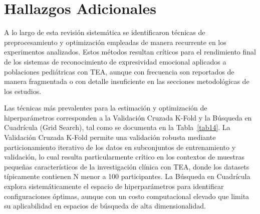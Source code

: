 \documentclass[3p,twocolumn,times]{elsarticle}
\begin{document}
	\section{Hallazgos Adicionales}\label{sec5}
	
	A lo largo de esta revisión sistemática se identificaron técnicas de
	preprocesamiento y optimización empleadas de manera recurrente en los experimentos
	analizados. Estos métodos resultan críticos para el rendimiento final de los
	sistemas de reconocimiento de expresividad emocional aplicados a poblaciones
	pediátricas con TEA, aunque con frecuencia son reportados de manera fragmentada o
	con detalle insuficiente en las secciones metodológicas de los estudios.
	
	Las técnicas más prevalentes para la estimación y optimización de hiperparámetros
	corresponden a la Validación Cruzada K-Fold y la Búsqueda en Cuadrícula (Grid
	Search), tal como se documenta en la Tabla~\ref{tab14}. La Validación Cruzada
	K-Fold permite una validación robusta mediante particionamiento iterativo de los
	datos en subconjuntos de entrenamiento y validación, lo cual resulta particularmente
	crítico en los contextos de muestras pequeñas característicos de la investigación
	clínica con TEA, donde los datasets típicamente contienen N menor a 100
	participantes. La Búsqueda en Cuadrícula explora sistemáticamente el espacio de
	hiperparámetros para identificar configuraciones óptimas, aunque con un costo
	computacional elevado que limita su aplicabilidad en espacios de búsqueda de alta
	dimensionalidad.
	
\end{document}
